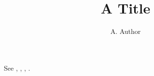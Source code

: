\documentclass{article}
\title{A Title}
\author{A. Author}
\begin{document}
\maketitle
See \jcap, \apj, \prl, \mnras.
\end{document}
